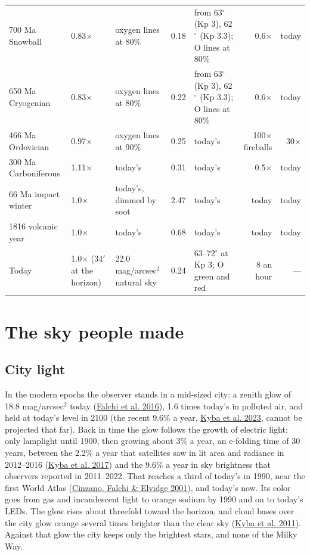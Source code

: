 \documentclass[9pt,twocolumn]{extarticle}
\begin{document}
\begin{table}[tp]
\begin{tabularx}{\textwidth}{@{}lp{2.1cm}YrYrr@{}}
700 Ma Snowball & 0.83$\times$ & oxygen lines at 80\% & 0.18 & from 63$^\circ$ (Kp 3), 62$^\circ$ (Kp 3.3); O lines at 80\% & 0.6$\times$ & today \\
650 Ma Cryogenian & 0.83$\times$ & oxygen lines at 80\% & 0.22 & from 63$^\circ$ (Kp 3), 62$^\circ$ (Kp 3.3); O lines at 80\% & 0.6$\times$ & today \\
466 Ma Ordovician & 0.97$\times$ & oxygen lines at 90\% & 0.25 & today's & 100$\times$ fireballs & 30$\times$ \\
300 Ma Carboniferous & 1.11$\times$ & today's & 0.31 & today's & 0.5$\times$ & today \\
66 Ma impact winter & 1.0$\times$ & today's, dimmed by soot & 2.47 & today's & today & today \\
1816 volcanic year & 1.0$\times$ & today's & 0.68 & today's & today & today \\
Today & 1.0$\times$ (34$'$ at the horizon) & 22.0 mag/arcsec$^{2}$ natural sky & 0.24 & 63--72$^\circ$ at Kp 3; O green and red & 8 an hour & --- \\
\bottomrule\end{tabularx}
\end{table}


\section{The sky people made}\label{people}


\subsection{City light}\label{city-light}

In the modern epochs the observer stands in a mid-sized city: a zenith glow of 18.8 mag/arcsec$^{2}$ today (\protect\hyperlink{cite.falchi2016}{Falchi et al. 2016}), 1.6 times today's in polluted air, and held at today's level in 2100 (the recent 9.6\% a year, \protect\hyperlink{cite.kyba2023}{Kyba et al. 2023}, cannot be projected that far). Back in time the glow follows the growth of electric light: only lamplight until 1900, then growing about 3\% a year, an e-folding time of 30 years, between the 2.2\% a year that satellites saw in lit area and radiance in 2012--2016 (\protect\hyperlink{cite.kyba2017}{Kyba et al. 2017}) and the 9.6\% a year in sky brightness that observers reported in 2011--2022. That reaches a third of today's in 1990, near the first World Atlas (\protect\hyperlink{cite.cinzano2001}{Cinzano, Falchi \& Elvidge 2001}), and today's now. Its color goes from gas and incandescent light to orange sodium by 1990 and on to today's LEDs. The glow rises about threefold toward the horizon, and cloud bases over the city glow orange several times brighter than the clear sky (\protect\hyperlink{cite.kyba2011}{Kyba et al. 2011}). Against that glow the city keeps only the brightest stars, and none of the Milky Way.
\end{document}

